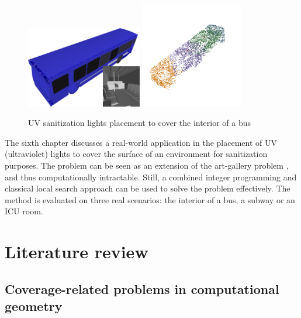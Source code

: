 \begin{figure}[ht]
    \centering
    \includegraphics[width = 0.45\textwidth]{chapters/surf/fig/bus.png}
    \hfill
    \includegraphics[width = 0.4\textwidth]{chapters/surf/fig/bus_result_3.png}
    \caption{UV sanitization lights placement to cover the interior of a bus}
    \label{fig:intro-surf}
\end{figure}

The sixth chapter discusses a real-world application in the placement of UV (ultraviolet) lights 
to cover the surface of an environment for sanitization purposes. The problem can be seen as an extension
of the art-gallery problem \cite{o1987art}, and thus computationally intractable.
Still, a combined integer programming and classical local search approach can be used to
solve the problem effectively. The method is evaluated on three real scenarios: 
the interior of a bus, a subway or an ICU room. 


\section{Literature review} 


\subsection{Coverage-related problems in computational geometry}

